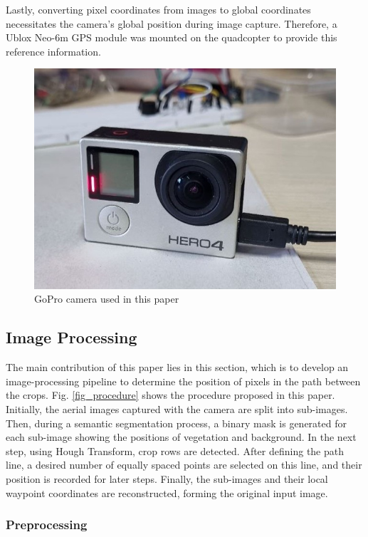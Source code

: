 \documentclass[conference]{IEEEtran}
\begin{document}
	Lastly, converting pixel coordinates from images to global coordinates necessitates the camera's global position during image capture. Therefore, a Ublox Neo-6m GPS module was mounted on the quadcopter to provide this reference information.
	
	
	\begin{figure}[t]
		\centering
		\includegraphics[width=0.7\linewidth]{GoPro.jpg}
		\caption{GoPro camera used in this paper}
		\label{gopro}
	\end{figure}
	
	
	\subsection{Image Processing}\label{Image Processing}
	The main contribution of this paper lies in this section, which is to develop an image-processing pipeline to determine the position of pixels in the path between the crops. Fig.
	\ref{fig_procedure}
	shows the procedure proposed in this paper. Initially, the aerial images captured with the camera are split into sub-images. Then, during a semantic segmentation process, a binary mask is generated for each sub-image showing the positions of vegetation and background. In the next step, using Hough Transform, crop rows are detected. After defining the path line, a desired number of equally spaced points are selected on this line, and their position is recorded for later steps. Finally, the sub-images and their local waypoint coordinates are reconstructed, forming the original input image.
	
	\subsubsection{Preprocessing}\label{Preprocessing}\leavevmode
	
\end{document}
